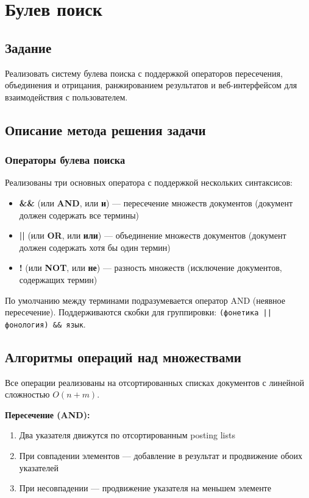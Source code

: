 \section{Булев поиск}

\subsection{Задание}

Реализовать систему булева поиска с поддержкой операторов пересечения, объединения и отрицания, ранжированием результатов и веб-интерфейсом для взаимодействия с пользователем.

\subsection{Описание метода решения задачи}

\subsubsection{Операторы булева поиска}

Реализованы три основных оператора с поддержкой нескольких синтаксисов:

\begin{itemize}
    \item \textbf{\&\&} (или \textbf{AND}, или \textbf{и}) --- пересечение множеств документов (документ должен содержать все термины)
    \item \textbf{||} (или \textbf{OR}, или \textbf{или}) --- объединение множеств документов (документ должен содержать хотя бы один термин)
    \item \textbf{!} (или \textbf{NOT}, или \textbf{не}) --- разность множеств (исключение документов, содержащих термин)
\end{itemize}

По умолчанию между терминами подразумевается оператор AND (неявное пересечение). Поддерживаются скобки для группировки: \texttt{(фонетика || фонология) \&\& язык}.

\subsection{Алгоритмы операций над множествами}

Все операции реализованы на отсортированных списках документов с линейной сложностью $O(n + m)$.

\textbf{Пересечение (AND):}
\begin{enumerate}
    \item Два указателя движутся по отсортированным posting lists
    \item При совпадении элементов --- добавление в результат и продвижение обоих указателей
    \item При несовпадении --- продвижение указателя на меньшем элементе
\end{enumerate}

